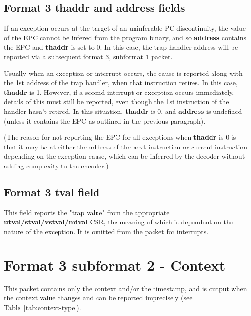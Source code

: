 \subsection{Format 3 \textbf{thaddr} and \textbf{address} fields} \label{sec:thaddr}

If an exception occurs at the target of an uninferable PC discontinuity, the value of 
the EPC cannot be infered from the program binary, and so \textbf{address} contains the EPC and 
\textbf{thaddr} is set to 0.  In this case, the trap handler address will be reported
via a subsequent format 3, subformat 1 packet.

Usually when an exception or interrupt occurs, the cause is reported along 
with the 1st address of the trap handler, when that instruction retires.  In this case, 
\textbf{thaddr} is 1.  However, if a second interrupt or exception occurs immediately, details of 
this must still be reported, even though the 1st instruction of the handler hasn't retired.  In this 
situation,  \textbf{thaddr} is 0, and \textbf{address} is undefined (unless it contains the EPC as
outlined in the previous paragraph).

(The reason for not reporting the EPC for all exceptions when \textbf{thaddr} is 0 is
that it may be at either the address of the next instruction or current instruction depending on the 
exception cause, which can be inferred by the decoder without adding complexity to the encoder.)

\subsection{Format 3 \textbf{tval} field}

This field reports the "trap value" from the appropriate \textbf{utval/stval/vstval/mtval}
CSR, the meaning of which is dependent on the nature of the exception.  It is omitted
from the packet for interrupts.

\FloatBarrier
\section{Format 3 subformat 2 - Context} \label{sec:format32}

This packet contains only the context and/or the timestamp, and is output when the context value 
changes and can be reported imprecisely (see Table~\ref{tab:context-type}).

